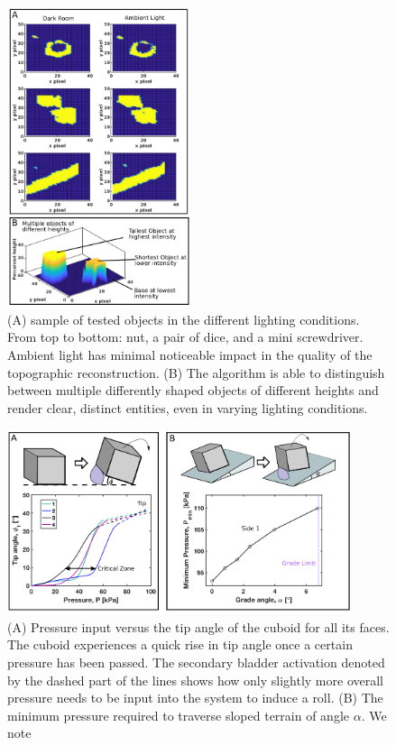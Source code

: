 \documentclass[letterpaper, 12 pt, conference]{ieeeconf}  %
\begin{document}
 \begin{figure}
 \centering
 \includegraphics[width=0.48\textwidth]{Figures/Fig5.png}
 \caption{(A) sample of tested objects in the different lighting conditions. From top to bottom: nut, a pair of dice, and a mini screwdriver. Ambient light has minimal noticeable impact in the quality of the topographic reconstruction. (B) The algorithm is able to distinguish between multiple differently shaped objects of different heights and render clear, distinct entities, even in varying lighting conditions.}
 \label{fig:lighting} 
 \end{figure}


\begin{figure}
\centering
\includegraphics[width=0.9\textwidth]{Figures/Fig6.png}
\caption{(A) Pressure input versus the tip angle of the cuboid for all its faces. The cuboid experiences a quick rise in tip angle once a certain pressure has been passed. The secondary bladder activation denoted by the dashed part of the lines shows how only slightly more overall pressure needs to be input into the system to induce a roll. (B) The minimum pressure required to traverse sloped terrain of angle $\alpha$. We note }
\label{fig:tipping} 
\end{figure}
\end{document}
